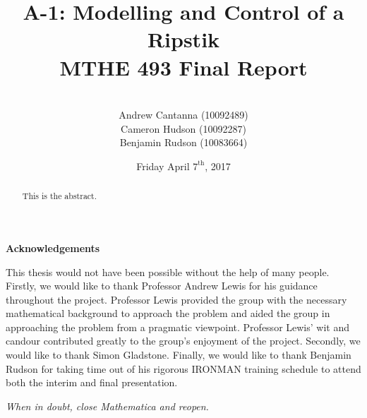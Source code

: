 \documentclass[11pt,letterpaper]{article}
\title{ A-1: Modelling and Control of a Ripstik\textsuperscript{\textregistered} \\MTHE 493 Final Report}
\date{Friday April $7^{\textrm{th}}$, 2017}
\author{\\Andrew Cantanna (10092489) \\Cameron Hudson (10092287)\\
	Benjamin Rudson (10083664)\\}
\theoremstyle{definition}
\begin{document}
	\begin{titlepage}
		\maketitle
		\thispagestyle{empty}		
	\end{titlepage}
	\newpage
\begin{abstract}
	This is the abstract.
\end{abstract}	
\clearpage
\newpage
\begin{center}
\textbf{Acknowledgements}
\end{center}
This thesis would not have been possible without the help of many people. 
Firstly, we would like to thank Professor Andrew Lewis for his guidance throughout the project. 
Professor Lewis provided the group with the necessary mathematical background to approach the problem and aided the group in approaching the problem from a pragmatic viewpoint. 
Professor Lewis' wit and candour contributed greatly to the group's enjoyment of the project.
Secondly, we would like to thank Simon Gladstone.
Finally, we would like to thank Benjamin Rudson for taking time out of his rigorous IRONMAN training schedule to attend both the interim and final presentation. 

\vspace*{\fill}
\begin{center}
\textit{When in doubt, close Mathematica and reopen.}
\end{center}
\newpage	
	\renewcommand{\baselinestretch}{0.75}\normalsize
	\tableofcontents
	\renewcommand{\baselinestretch}{1.0}\normalsize

\newpage
\listoffigures
\newpage
\listoftables


\clearpage
{}
	
	\newpage



	\pagestyle{fancy}






\newpage
\printbibliography
\end{document}
